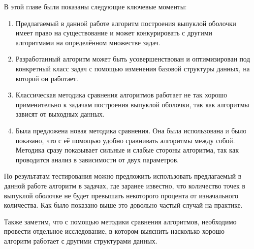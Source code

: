 В этой главе были показаны следующие ключевые моменты:
\begin{enumerate}
	\item Предлагаемый в данной работе алгоритм построения выпуклой оболочки имеет право на существование и может конкурировать с другими алгоритмами на определённом множестве задач.
	\item Разработанный алгоритм может быть усовершенствован и оптимизирован под конкретный класс задач с помощью изменения базовой структуры данных, на которой он работает.
	\item Классическая методика сравнения алгоритмов работает не так хорошо применительно к задачам построения выпуклой оболочки, так как алгоритмы зависят от выходных данных.
	\item Была предложена новая методика сравнения. Она была использована и было показано, что с её помощью удобно сравнивать алгоритмы между собой. Методика сразу показывает сильные и слабые стороны алгоритма, так как проводится анализ в зависимости от двух параметров.
\end{enumerate}

По результатам тестирования можно предложить использовать предлагаемый в данной работе алгоритм в задачах, где заранее известно, что количество точек в выпуклой оболочке не будет превышать некоторого процента от изначального количества. Как было показано выше это довольно частый случай на практике.

Также заметим, что с помощью методики сравнения алгоритмов, необходимо провести отдельное исследование, в котором выяснить насколько хорошо алгоритм работает с другими структурами данных.

